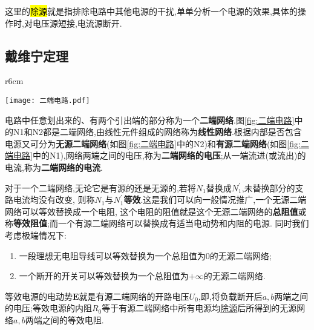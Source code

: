 \begin{remark}
    这里的\hl{\hypertarget{除源}{除源}\label{tips:除源}}就是指排除电路中其他电源的干扰,单单分析一个电源的效果,具体的操作时,对电压源短接,电流源断开.
\end{remark}

\newpage
\subsection{\K 戴维宁定理}

\begin{definition}[二端网络]

    \begin{wrapfigure}{r}{6cm}
        \begin{center}
            \texttt{[image: 二端电路.pdf]}
        \end{center}
        \caption{二端电路}
        \label{fig:二端电路}
    \end{wrapfigure}
    \Par 电路中任意划出来的、有两个引出端的部分称为一个\textbf{二端网络}.图\ref{fig:二端电路}中的N1和N2都是二端网络,由线性元件组成的网络称为\textbf{线性网络}.根据内部是否包含电源又可分为\textbf{无源二端网络}(如图\ref{fig:二端电路}中的N2)和\textbf{有源二端网络}(如图\ref{fig:二端电路}中的N1),网络两端之间的电压,称为\textbf{二端网络的电压};从一端流进(或流出)的电流,称为\textbf{二端网络的电流}.
    \end{definition}
    
    \Par 对于一个二端网络,无论它是有源的还是无源的,若将$N_1$替换成$N_1^{'}$,未替换部分的支路电流均没有改变,
    则称$N_1$与$N_1^{'}$\textbf{等效}.这是我们可以向一般情况推广,一个无源二端网络可以等效替换成一个电阻,
    这个电阻的阻值就是这个无源二端网络的\textbf{总阻值}或称\textbf{等效阻值};而一个有源二端网络可以替换成有适当电动势和内阻的电源.
    同时我们考虑极端情况下:
    \begin{enumerate}
        \item [\circledtext{1}] 一段理想无电阻导线可以等效替换为一个总阻值为0的无源二端网络;
        \item [\circledtext{2}] 一个断开的开关可以等效替换为一个总阻值为$+\infty$的无源二端网络.
    \end{enumerate}

\begin{theorem}[戴维宁定理]
\Par 等效电源的电动势$\boldsymbol{E}$就是有源二端网络的开路电压$U_0$,即,将负载断开后$a,b$两端之间的电压;等效电源的内阻$R_0$等于有源二端网络中所有电源均\hyperlink{除源}{除源}后所得到的无源网络$a,b$两端之间的等效电阻.
\end{theorem}

